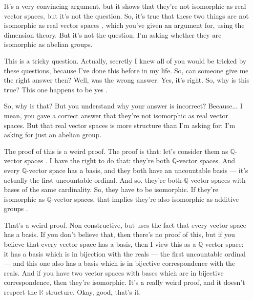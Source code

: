 \begin{speech}[00:40:15 - 00:42:19]
It's a very convincing argument, but it shows that they're not isomorphic as real vector spaces, but it's not the question. So, it's true that these two things are not isomorphic as real vector spaces , which you've given an argument for, using the dimension theory. But it's not the question. I'm asking whether they are isomorphic as abelian groups.

This is a tricky question. Actually, secretly I knew all of you would be tricked by these questions, because I've done this before in my life. So, can someone give me the right answer then? Well,  was the wrong answer.  Yes, it's right. So, why is this true? This one happens to be yes .

So, why is that?  But you understand why your answer is incorrect? Because... I mean, you gave a correct answer that they're not isomorphic as real vector spaces. But that real vector spaces is more structure than I'm asking for: I'm asking for just an abelian group.

The proof of this is a weird proof. The proof is that: let's consider them as $\mathbb{Q}$-vector spaces . I have the right to do that: they're both $\mathbb{Q}$-vector spaces. And every $\mathbb{Q}$-vector space has a basis, and they both have an uncountable basis --- it's actually the first uncountable ordinal. And so, they're both $\mathbb{Q}$-vector spaces with bases of the same cardinality. So, they have to be isomorphic. If they're isomorphic as $\mathbb{Q}$-vector spaces, that implies they're also isomorphic as additive groups .

That's a weird proof. Non-constructive, but uses the fact that every vector space has a basis. If you don't believe that, then there's no proof of this, but if you believe that every vector space has a basis, then I view this as a $\mathbb{Q}$-vector space: it has a basis which is in bijection with the reals --- the first uncountable ordinal --- and this one also has a basis which is in bijective correspondence with the reals. And if you have two vector spaces with bases which are in bijective correspondence, then they're isomorphic. It's a really weird proof, and it doesn't respect the $\mathbb{R}$ structure. Okay, good, that's it.
\end{speech}

